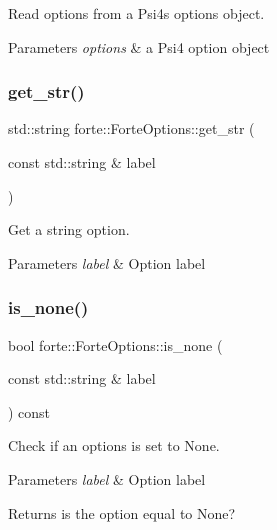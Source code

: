 Read options from a Psi4\textquotesingle{}s options object. 


\begin{DoxyParams}{Parameters}
{\em options} & a Psi4 option object \\
\hline
\end{DoxyParams}
\mbox{\label{classforte_1_1_forte_options_a4442d17f7a49bb6d85ee20accfa88c9e}} 
\subsubsection{\texorpdfstring{get\+\_\+str()}{get\_str()}}
{\footnotesize\ttfamily std\+::string forte\+::\+Forte\+Options\+::get\+\_\+str (\begin{DoxyParamCaption}\item[{const std\+::string \&}]{label }\end{DoxyParamCaption})}



Get a string option. 


\begin{DoxyParams}{Parameters}
{\em label} & Option label \\
\hline
\end{DoxyParams}
\mbox{\label{classforte_1_1_forte_options_aaabb27801a162d6a5eddd14bd1acb40a}} 
\subsubsection{\texorpdfstring{is\+\_\+none()}{is\_none()}}
{\footnotesize\ttfamily bool forte\+::\+Forte\+Options\+::is\+\_\+none (\begin{DoxyParamCaption}\item[{const std\+::string \&}]{label }\end{DoxyParamCaption}) const}



Check if an options is set to None. 


\begin{DoxyParams}{Parameters}
{\em label} & Option label \\
\hline
\end{DoxyParams}
\begin{DoxyReturn}{Returns}
is the option equal to None? 
\end{DoxyReturn}
\mbox{\label{classforte_1_1_forte_options_af177038deb74406fa41ac29a024edde2}} 
